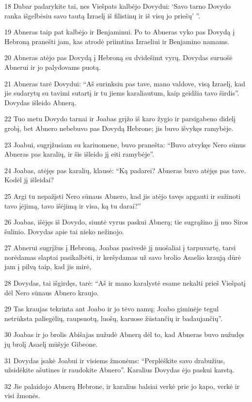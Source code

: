 \par 18 Dabar padarykite tai, nes Viešpats kalbėjo Dovydui: ‘Savo tarno Dovydo ranka išgelbėsiu savo tautą Izraelį iš filistinų ir iš visų jo priešų’ ”. 
\par 19 Abneras taip pat kalbėjo ir Benjaminui. Po to Abneras vyko pas Dovydą į Hebroną pranešti jam, kas atrodė priimtina Izraeliui ir Benjamino namams. 
\par 20 Abneras atėjo pas Dovydą į Hebroną su dvidešimt vyrų. Dovydas suruošė Abnerui ir jo palydovams puotą. 
\par 21 Abneras tarė Dovydui: “Aš surinksiu pas tave, mano valdove, visą Izraelį, kad jie sudarytų su tavimi sutartį ir tu jiems karaliautum, kaip geidžia tavo širdis”. Dovydas išleido Abnerą. 
\par 22 Tuo metu Dovydo tarnai ir Joabas grįžo iš karo žygio ir parsigabeno didelį grobį, bet Abnero nebebuvo pas Dovydą Hebrone; jis buvo išvykęs ramybėje. 
\par 23 Joabui, sugrįžusiam su kariuomene, buvo pranešta: “Buvo atvykęs Nero sūnus Abneras pas karalių, ir šis išleido jį eiti ramybėje”. 
\par 24 Joabas, atėjęs pas karalių, klausė: “Ką padarei? Abneras buvo atėjęs pas tave. Kodėl jį išleidai? 
\par 25 Argi tu nepažįsti Nero sūnaus Abnero, kad jis atėjo tavęs apgauti ir sužinoti tavo įėjimą, tavo išėjimą ir visa, ką tu darai?” 
\par 26 Joabas, išėjęs iš Dovydo, siuntė vyrus paskui Abnerą; tie sugrąžino jį nuo Siros šulinio. Dovydas apie tai nieko nežinojo. 
\par 27 Abnerui sugrįžus į Hebroną, Joabas pasivedė jį nuošaliai į tarpuvartę, tarsi norėdamas slaptai pasikalbėti, ir keršydamas už savo brolio Asaelio kraują dūrė jam į pilvą taip, kad jis mirė, 
\par 28 Dovydas, tai išgirdęs, tarė: “Aš ir mano karalystė esame nekalti prieš Viešpatį dėl Nero sūnaus Abnero kraujo. 
\par 29 Tas kraujas tekrinta ant Joabo ir jo tėvo namų; Joabo giminėje tegul netrūksta paliegėlių, raupsuotų, luošų, karuose žūstančių ir badaujančių”. 
\par 30 Joabas ir jo brolis Abišajas nužudė Abnerą dėl to, kad Abneras buvo nužudęs jų brolį Asaelį mūšyje Gibeone. 
\par 31 Dovydas įsakė Joabui ir visiems žmonėms: “Perplėškite savo drabužius, užsidėkite ašutines ir raudokite Abnero”. Karalius Dovydas ėjo paskui karstą. 
\par 32 Jie palaidojo Abnerą Hebrone, ir karalius balsiai verkė prie jo kapo, verkė ir visi žmonės. 
